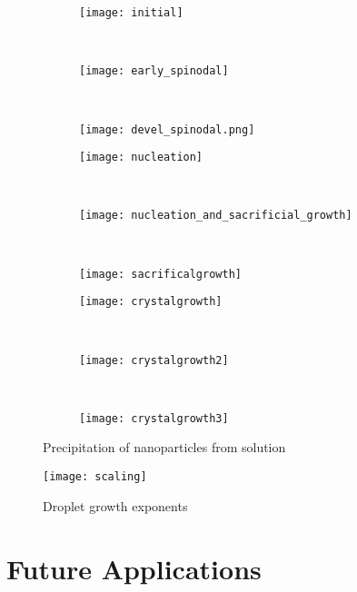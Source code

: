\begin{figure}
    \centering
    \begin{subfigure}[b]{0.3\textwidth}
        \texttt{[image: initial]}
        \label{fig:initial}
        \caption{}
    \end{subfigure}
    ~
    \begin{subfigure}[b]{0.3\textwidth}
        \texttt{[image: early\_spinodal]}
        \label{fig:early_spinodal}
        \caption{}
    \end{subfigure}
    ~
    \begin{subfigure}[b]{0.3\textwidth}
        \texttt{[image: devel\_spinodal.png]}
        \label{fig:devel_spinodal}
        \caption{}
    \end{subfigure}

    \vspace{0.5cm}
    \begin{subfigure}[b]{0.3\textwidth}
        \texttt{[image: nucleation]}
        \label{fig:nucleation}
        \caption{}
    \end{subfigure}
    ~
    \begin{subfigure}[b]{0.3\textwidth}
        \texttt{[image: nucleation\_and\_sacrificial\_growth]}
        \label{fig:nucleation_and_growth}
        \caption{} 
    \end{subfigure}
    ~
    \begin{subfigure}[b]{0.3\textwidth}
        \texttt{[image: sacrificalgrowth]}
        \label{fig:sacrifical_growth}
        \caption{}
    \end{subfigure}
    
    \vspace{0.5cm}
    \begin{subfigure}[b]{0.3\textwidth}
        \texttt{[image: crystalgrowth]}
        \label{fig:crystalgrowth}
        \caption{}
    \end{subfigure}
    ~
    \begin{subfigure}[b]{0.3\textwidth}
        \texttt{[image: crystalgrowth2]}
        \label{fig:crystalgrowth2}
        \caption{}
    \end{subfigure}
    ~ 
    \begin{subfigure}[b]{0.3\textwidth}
        \texttt{[image: crystalgrowth3]}
        \label{fig:crystalgrowth3}
        \caption{}
    \end{subfigure}
    \label{fig:preciptiation}
    \caption{Precipitation of nanoparticles from solution}
\end{figure}

\begin{figure}
    \centering
    \texttt{[image: scaling]}
    \label{fig:scaling}
    \caption{Droplet growth exponents}
\end{figure}

\section{Future Applications} %

